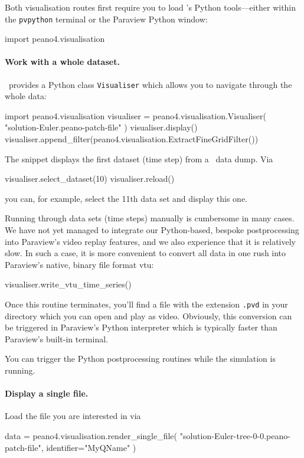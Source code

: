 Both visualisation routes first require you to load \Peano's Python tools---either
within the \texttt{pvpython} terminal or the Paraview Python window:
\begin{code}
import peano4.visualisation  
\end{code}


\paragraph{Work with a whole dataset.}
%
%
%
\Peano\ provides a Python class \texttt{Visualiser} which allows you to navigate through the whole data:
\begin{code}
import peano4.visualisation
visualiser = peano4.visualisation.Visualiser( "solution-Euler.peano-patch-file" )
visualiser.display()
visualiser.append_filter(peano4.visualisation.ExtractFineGridFilter())
\end{code}

\noindent
The snippet displays the first dataset (time step) from a \Peano\ data dump.
Via 
\begin{code}
visualiser.select_dataset(10)
visualiser.reload()
\end{code}
you can, for example, select the 11th data set and display this one.


Running through data sets (time steps) manually is cumbersome in many cases.
We have not yet managed to integrate our Python-based, bespoke postprocessing
into Paraview's video replay features, and we also experience that it is relatively 
slow.
In such a case, it is more convenient to convert all data in one rush 
into Paraview's native, binary file format vtu:
\begin{code}
visualiser.write_vtu_time_series()
\end{code}


\noindent
Once this routine terminates, you'll find a file with the extension \texttt{.pvd}
in your directory which you can open and play as video.
Obviously, this conversion can be triggered in Paraview's Python interpreter 
which is typically faster than Paraview's built-in terminal.

\begin{remark}
 You can trigger the Python postprocessing routines while the simulation is running.
\end{remark}



\paragraph{Display a single file.}
%
%
Load the file you are interested in via
\begin{code}
data = peano4.visualisation.render_single_file(  "solution-Euler-tree-0-0.peano-patch-file", identifier="MyQName" )
\end{code}

